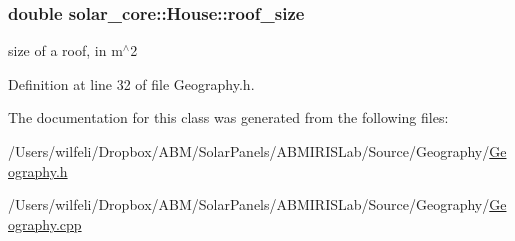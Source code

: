 \subsubsection[{roof\+\_\+size}]{\setlength{\rightskip}{0pt plus 5cm}double solar\+\_\+core\+::\+House\+::roof\+\_\+size}\label{classsolar__core_1_1_house_a7f872cb768b83e70e263590078fa4c7d}
size of a roof, in m$^\wedge$2 

Definition at line 32 of file Geography.\+h.



The documentation for this class was generated from the following files\+:\begin{DoxyCompactItemize}
\item 
/\+Users/wilfeli/\+Dropbox/\+A\+B\+M/\+Solar\+Panels/\+A\+B\+M\+I\+R\+I\+S\+Lab/\+Source/\+Geography/\hyperlink{_geography_8h}{Geography.\+h}\item 
/\+Users/wilfeli/\+Dropbox/\+A\+B\+M/\+Solar\+Panels/\+A\+B\+M\+I\+R\+I\+S\+Lab/\+Source/\+Geography/\hyperlink{_geography_8cpp}{Geography.\+cpp}\end{DoxyCompactItemize}
